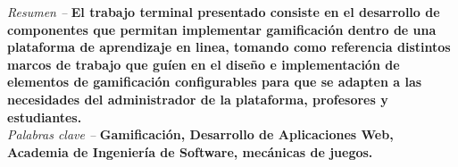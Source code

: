 
{\it Resumen -- } %
{\bf
    El trabajo terminal presentado consiste en el desarrollo de componentes que
    permitan implementar gamificación dentro de una plataforma de aprendizaje en
    linea, tomando como referencia distintos marcos de trabajo que guíen en el
    diseño e implementación de elementos de gamificación configurables para que
    se adapten a las necesidades del administrador de la plataforma, profesores
    y estudiantes.
}\\

{\it Palabras clave -- } %
{\bf
    Gamificación, Desarrollo de Aplicaciones Web, Academia de Ingeniería de Software,
    mecánicas de juegos.
}
